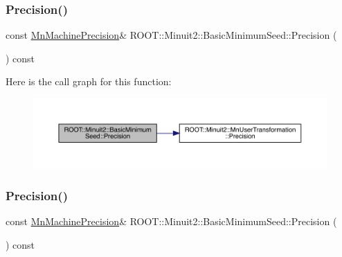 \subsubsection{\texorpdfstring{Precision()}{Precision()}\hspace{0.1cm}{\footnotesize\ttfamily [1/2]}}
{\footnotesize\ttfamily const \mbox{\hyperlink{classROOT_1_1Minuit2_1_1MnMachinePrecision}{Mn\+Machine\+Precision}}\& R\+O\+O\+T\+::\+Minuit2\+::\+Basic\+Minimum\+Seed\+::\+Precision (\begin{DoxyParamCaption}{ }\end{DoxyParamCaption}) const\hspace{0.3cm}{\ttfamily [inline]}}

Here is the call graph for this function\+:
\nopagebreak
\begin{figure}[H]
\begin{center}
\leavevmode
\includegraphics[width=350pt]{de/d50/classROOT_1_1Minuit2_1_1BasicMinimumSeed_af06c66e8851f7314915e01e0bedb200c_cgraph}
\end{center}
\end{figure}
\mbox{\label{classROOT_1_1Minuit2_1_1BasicMinimumSeed_af06c66e8851f7314915e01e0bedb200c}} 
\subsubsection{\texorpdfstring{Precision()}{Precision()}\hspace{0.1cm}{\footnotesize\ttfamily [2/2]}}
{\footnotesize\ttfamily const \mbox{\hyperlink{classROOT_1_1Minuit2_1_1MnMachinePrecision}{Mn\+Machine\+Precision}}\& R\+O\+O\+T\+::\+Minuit2\+::\+Basic\+Minimum\+Seed\+::\+Precision (\begin{DoxyParamCaption}{ }\end{DoxyParamCaption}) const\hspace{0.3cm}{\ttfamily [inline]}}

